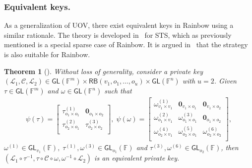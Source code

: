 \documentclass[12pt, a4paper, oneside]{memoir}
\newtheorem{theorem}{Theorem}[section]
\theoremstyle{definition}
\begin{document}
\subsubsection{Equivalent keys.}

As a generalization of UOV, there exist equivalent keys in Rainbow using a similar rationale. The theory is developed in~\cite[Section 4.4]{Wolf:201104} for STS, which as previously mentioned is a special sparse case of Rainbow. It is argued in~\cite{Petzoldt:201307} that the strategy is also suitable for Rainbow.

\begin{theorem}[{\cite[Theorem 4.17]{Wolf:201104}}]
  Without loss of generality, consider a private key $(\mathcal{L}_{1}, \mathcal{C}, \mathcal{L}_{2}) \in \mathsf{GL}(\mathbb{F}^{m}) \times \mathsf{RB}(v_{1}, o_{1}, \dots, o_{u}) \times \mathsf{GL}(\mathbb{F}^{n})$ with $u = 2$. Given $\tau \in \mathsf{GL}(\mathbb{F}^{m})$ and $\omega \in \mathsf{GL}(\mathbb{F}^{n})$ such that
  \begin{align}
    \psi(\tau) =
    \begin{bmatrix}
      \tau_{o_{1} \times o_{1}}^{(1)} & \mathbf{0}_{o_{1} \times o_{2}} \\
      \tau_{o_{2} \times o_{1}}^{(2)} & \tau_{o_{2} \times o_{2}}^{(3)} \\
    \end{bmatrix},\;
    \psi(\omega) =
    \begin{bmatrix}
      \omega_{v_{1} \times v_{1}}^{(1)} & \mathbf{0}_{v_{1} \times o_{1}}   & \mathbf{0}_{v_{1} \times o_{2}} \\
      \omega_{o_{1} \times v_{1}}^{(2)} & \omega_{o_{1} \times o_{1}}^{(3)} & \mathbf{0}_{o_{1} \times o_{2}} \\
      \omega_{o_{2} \times v_{1}}^{(4)} & \omega_{o_{2} \times o_{1}}^{(5)} & \omega_{o_{2} \times o_{2}}^{(6)} \\
    \end{bmatrix},
  \end{align}
  $\omega^{(1)} \in \mathsf{GL}_{v_{1}}(\mathbb{F}),\; \tau^{(1)}, \omega^{(3)} \in \mathsf{GL}_{o_{1}}(\mathbb{F})$ and $\tau^{(3)}, \omega^{(6)} \in \mathsf{GL}_{o_{2}}(\mathbb{F})$, then $(\mathcal{L}_{1} \circ \tau^{-1}, \tau \circ \mathcal{C} \circ \omega, \omega^{-1} \circ \mathcal{L}_{2})$ is an equivalent private key.
\end{theorem}
\end{document}
